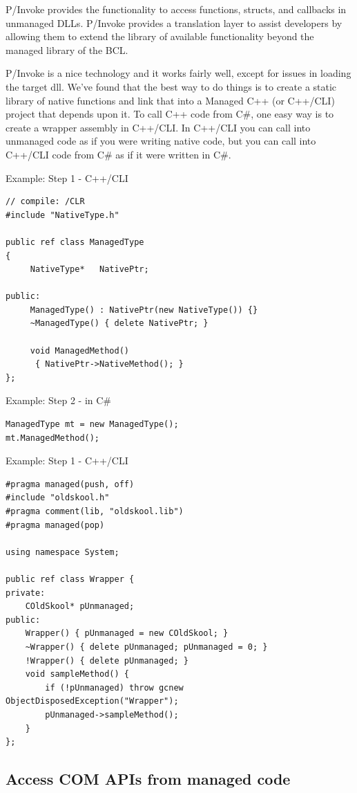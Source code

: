 P/Invoke provides the functionality to access functions, structs, and callbacks
in unmanaged DLLs. P/Invoke provides a translation layer to assist developers by
allowing them to extend the library of available functionality beyond the
managed library of the BCL. 

P/Invoke is a nice technology and it works fairly well, except for issues in
loading the target dll. We've found that the best way to do things is to create
a static library of native functions and link that into a Managed C++ (or
C++/CLI) project that depends upon it.  To call C++ code from C\#, one easy way
is to create a wrapper assembly in C++/CLI. In C++/CLI you can call into
unmanaged code as if you were writing native code, but you can call into C++/CLI
code from C\# as if it were written in C\#.

Example: Step 1 - C++/CLI
\begin{verbatim}
// compile: /CLR 
#include "NativeType.h"

public ref class ManagedType
{
     NativeType*   NativePtr; 

public:
     ManagedType() : NativePtr(new NativeType()) {}
     ~ManagedType() { delete NativePtr; }

     void ManagedMethod()
      { NativePtr->NativeMethod(); } 
}; 
\end{verbatim}

Example: Step 2 - in C\#
\begin{verbatim}
ManagedType mt = new ManagedType();
mt.ManagedMethod();
\end{verbatim}

Example: Step 1 - C++/CLI
\begin{verbatim}
#pragma managed(push, off)
#include "oldskool.h"
#pragma comment(lib, "oldskool.lib")
#pragma managed(pop)

using namespace System;

public ref class Wrapper {
private:
    COldSkool* pUnmanaged;
public:
    Wrapper() { pUnmanaged = new COldSkool; }
    ~Wrapper() { delete pUnmanaged; pUnmanaged = 0; }
    !Wrapper() { delete pUnmanaged; }
    void sampleMethod() { 
        if (!pUnmanaged) throw gcnew ObjectDisposedException("Wrapper");
        pUnmanaged->sampleMethod(); 
    }
};
\end{verbatim}

\subsection{Access COM APIs from managed code}


